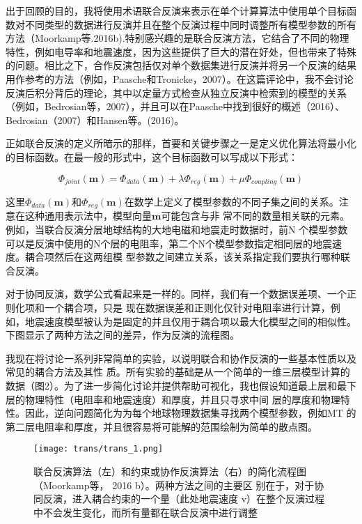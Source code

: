 出于回顾的目的，我将使用术语联合反演来表示在单个计算算法中使用单个目标函数对不同类型的数据进行反演并且在整个反演过程中同时调整所有模型参数的所有方法（Moorkamp等.2016b).特别感兴趣的是联合反演方法，它结合了不同的物理特性，例如电导率和地震速度，因为这些提供了巨大的潜在好处，但也带来了特殊的问题。相比之下，合作反演包括仅对单个数据集进行反演并将另一个反演的结果用作参考的方法（例如，Paasche和Tronicke，2007）。在这篇评论中，我不会讨论反演后积分背后的理论，其中以定量方式检查从独立反演中检索到的模型的关系（例如，Bedrosian等，2007），并且可以在Paasche中找到很好的概述（2016）、Bedrosian（2007）和Hansen等。(2016)。

正如联合反演的定义所暗示的那样，首要和关键步骤之一是定义优化算法将最小化的目标函数。在最一般的形式中，这个目标函数可以写成以下形式：

\begin{equation}
    \Phi_{joint}(\mathbf{m}) = \Phi_{data}(\mathbf{m}) +\lambda \Phi_{reg}(\mathbf{m})+\mu \Phi_{coupling}(\mathbf{m})
\end{equation}

这里$\Phi_{data}(\mathbf{m})$和$\Phi_{reg}(\mathbf{m})$在数学上定义了模型参数的不同子集之间的关系。注意在这种通用表示法中，模型向量$\mathbf{m}$可能包含与非 常不同的数量相关联的元素。例如，当联合反演分层地球结构的大地电磁和地震走时数据时，前N 个模型参数 可以是反演中使用的N个层的电阻率，第二个N个模型参数指定相同层的地震速度。耦合项然后在这两组模 型参数之间建立关系，该关系指定我们要执行哪种联合反演。

对于协同反演，数学公式看起来是一样的。同样，我们有一个数据误差项、一个正则化项和一个耦合项，只是 现在数据误差和正则化仅针对电阻率进行计算，例如，地震速度模型被认为是固定的并且仅用于耦合项以最大化模型之间的相似性。下图显示了两种方法之间的差异，作为反演的流程图。

我现在将讨论一系列非常简单的实验，以说明联合和协作反演的一些基本性质以及常见的耦合方法及其性 质。所有实验的基础是从一个简单的一维三层模型计算的数据（图2）。为了进一步简化讨论并提供帮助可视化，我也假设知道最上层和最下层的物理特性（电阻率和地震速度）和厚度，并且只寻求中间 层的厚度和物理特性。因此，逆向问题简化为为每个地球物理数据集寻找两个模型参数，例如MT 的第二层电阻率和厚度，并且很容易将可能解的范围绘制为简单的散点图。

\begin{figure}
    \centering
    \texttt{[image: trans/trans\_1.png]}
    \caption[]{联合反演算法（左）和约束或协作反演算法（右）的简化流程图（Moorkamp等， 2016 b）。两种方法之间的主要区 别在于，对于协同反演，进入耦合约束的一个量（此处地震速度 v）在整个反演过程中不会发生变化，而所有量都在联合反演中进行调整}
\end{figure}

